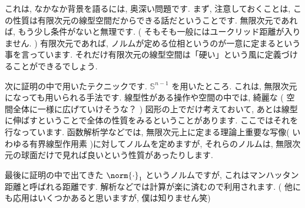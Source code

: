 \begin{column}
    これは, なかなか背景を語るには, 奥深い問題です. まず, 注意しておくことは, この性質は有限次元の線型空間だからできる話だということです. 無限次元であれば, もう少し条件がないと無理です. ( そもそも一般にはユークリッド距離が入りません. ) 有限次元であれば, ノルムが定める位相というのが一意に定まるという事を言っています. それだけ有限次元の線型空間は「硬い」という風に定義づけることができるでしょう.

    次に証明の中で用いたテクニックです.  $\mathbb{S}^{n-1}$ を用いたところ. これは, 無限次元になっても用いられる手法です. 線型性がある操作や空間の中では, 綺麗な ( 空間全体に一様に広げていけそうな？ ) 図形の上でだけ考えておいて, あとは線型に伸ばすということで全体の性質をみるということがあります. ここではそれを行なっています. 函数解析学などでは, 無限次元上に定まる理論上重要な写像( いわゆる有界線型作用素 )に対してノルムを定めますが, それらのノルムは, 無限次元の球面だけで見れば良いという性質があったりします.

    最後に証明の中で出てきた $\norm{ \cdot } _ 1$ というノルムですが, これはマンハッタン距離と呼ばれる距離です. 解析などでは計算が楽に済むので利用されます. ( 他にも応用はいくつかあると思いますが, 僕は知りません笑)
\end{column}


